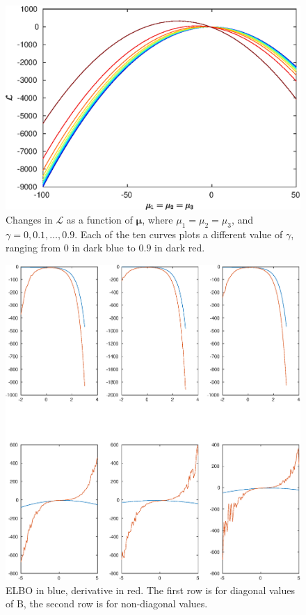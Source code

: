 \documentclass{mpaper}
\begin{document}
\begin{figure}
  \centering
  \includegraphics[width=\columnwidth]{elbo_over_gamma}
  \caption{Changes in $\mathcal{L}$ as a function of $\bm\mu$, where $\mu_1 =
    \mu_2 = \mu_3$, and $\gamma = 0, 0.1, \dots, 0.9$. Each of the ten curves
    plots a different value of $\gamma$, ranging from $0$ in dark blue to $0.9$
    in dark red.}
\end{figure}

\begin{figure}
  \centering
  \includegraphics[width=\textwidth]{ELBO_and_gradient_over_B}
  \caption{ELBO in blue, derivative in red. The first row is for diagonal values
  of B, the second row is for non-diagonal values.}
\end{figure}
\end{document}
